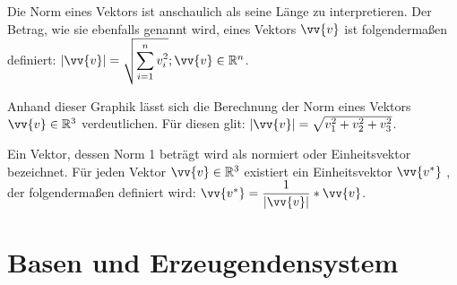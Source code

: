 \documentclass[main.tex]{subfiles}
\begin{document}
      \begin{Bemerkung}
        \begin{Definition}
        Die Norm eines Vektors ist anschaulich als seine Länge zu interpretieren. Der Betrag, wie sie ebenfalls genannt wird, eines
         Vektors $\vv{v}$ ist folgendermaßen definiert: $\text{|}\vv{v}\text{|} = \sqrt{\displaystyle\sum_{i=1}^{n}v_{i}^2} ; \vv{v}\in\R^n$.
        \end{Definition}
        \begin{minipage}{0.5\textwidth}
        \end{minipage}
        \begin{minipage}{0.5\textwidth}
          Anhand dieser Graphik lässt sich die Berechnung der Norm eines Vektors $\vv{v}\in\R^3$ verdeutlichen. Für diesen glit:
          $\text{|}\vv{v}\text{|}=\sqrt{v_1^{2}+v_2^{2}+v_3^{2}}$.
        \end{minipage}
      \end{Bemerkung}

      \begin{Definition}
        Ein Vektor, dessen Norm 1 beträgt wird als normiert oder Einheitsvektor bezeichnet. Für jeden Vektor $\vv{v}\in\R^{3}$ existiert ein Einheitsvektor $\vv{v^{*}}$ , der folgendermaßen definiert wird: $\vv{v^{*}}=\dfrac{1}{\text{|}\vv{v}\text{|}}*\vv{v}$.
      \end{Definition}




\section{Basen und Erzeugendensystem}
\end{document}
